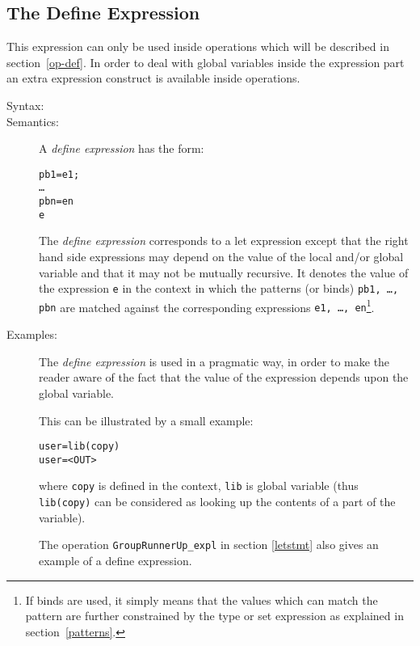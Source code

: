 \documentclass[\pformat,12pt]{article}
\begin{document}
\subsection{The Define Expression} \label{define-exp}

This expression can only be used inside operations which will be
described in section~\ref{op-def}. In order to deal with global variables
inside the expression part an extra expression construct is available
inside operations.

\begin{description}
\item[Syntax:]


\item[Semantics:] A {\it define expression} has the form:
  \begin{alltt}
     pb1 = e1;
        \ldots
        pbn = en
      e
  \end{alltt}
  The {\it define expression} corresponds to a let expression except
  that the right hand side expressions may depend on the value of the
  local and/or
  global variable and that it may not be mutually recursive.
  It denotes the value of the expression {\tt e} in the
  context in which the patterns (or binds) {\tt pb1, \ldots, pbn} are
  matched against the corresponding expressions {\tt e1, \ldots,
    en}\footnote{If binds are used, it simply means that the values
    which can match the pattern are further constrained by the type or
    set expression as explained in section~\ref{patterns}.}.

\item[Examples:] The {\it define expression} is
  used in a pragmatic way, in order to make the reader aware of the fact that
  the value of the expression depends upon the global variable.

  This can be illustrated by a small example:
  \begin{alltt}
     user = lib(copy) 
       user = <OUT>
       
       
  \end{alltt}      
  where {\tt copy} is defined in the context, {\tt lib} is global
  variable (thus {\tt lib(copy)} can be considered as looking up the
  contents of a part of the variable).

  The operation \texttt{GroupRunnerUp\_expl} in section \ref{letstmt}
  also gives an example of a define expression.
\end{description}
\end{document}
